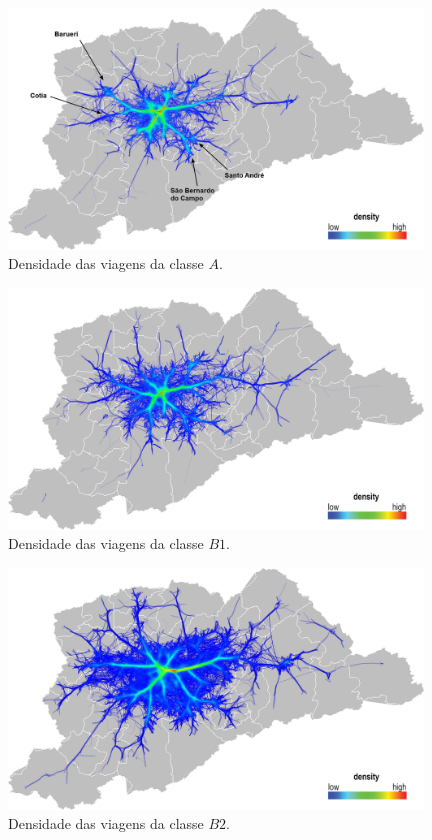 \begin{figure}[!htb]
  \centering
  \captionsetup{justification=centering}
  \includegraphics[width=0.98\textwidth]{../figuras/1-class-a.png}
  \caption{Densidade das viagens da classe $A$. \label{fig:becc-a}}
\end{figure}

\begin{figure}[!htb]
  \centering
  \captionsetup{justification=centering}
  \includegraphics[width=0.98\textwidth]{../figuras/2-class-b1.png}
  \caption{Densidade das viagens da classe $B1$. \label{fig:becc-b1}}
\end{figure}

\begin{figure}[!htb]
  \centering
  \captionsetup{justification=centering}
  \includegraphics[width=0.98\textwidth]{../figuras/3-class-b2.png}
  \caption{Densidade das viagens da classe $B2$. \label{fig:becc-b2}}
\end{figure}

